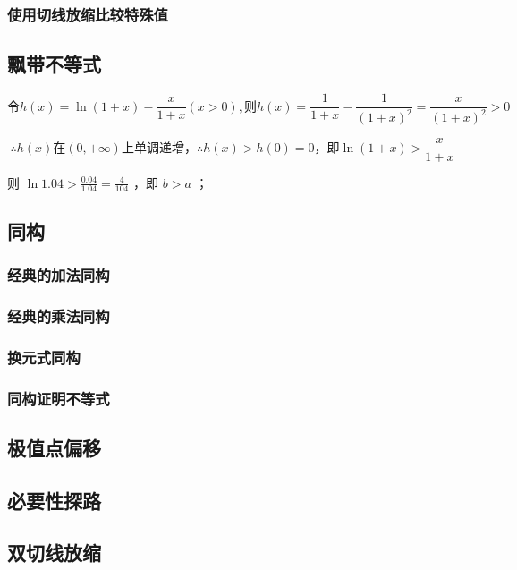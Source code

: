 \subsubsection{使用切线放缩比较特殊值}

\subsection{飘带不等式}

\begin{theorem}
    $$ \text{令} h(x)=\ln(1+x)-\frac{x}{1+x}(x>0), \text{则} h(x)=\frac{1}{1+x}-\frac{1}{(1+x)^2}=\frac{x}{(1+x)^2}>0 $$

    $$ \therefore h(x) \text{在} (0,+\infty) \text{上单调递增}，\therefore h(x)>h(0)=0 \text{，即} \ln(1+x)>\frac{x}{1+x} $$

    则 $\ln 1.04>\frac{0.04}{1.04}=\frac{4}{104}$ ，即 $b>a$ ；
\end{theorem}

\subsection{同构}

\subsubsection{经典的加法同构}

\subsubsection{经典的乘法同构}

\subsubsection{换元式同构}

\subsubsection{同构证明不等式}

\subsection{极值点偏移}

\subsection{必要性探路}

\subsection{双切线放缩}

\subsection{}